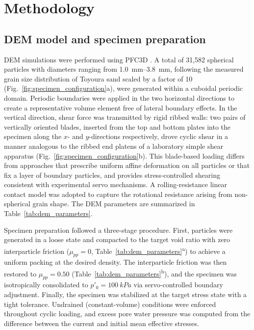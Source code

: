 \section{Methodology}
\label{sec:methodology}

\subsection{DEM model and specimen preparation}
\label{subsec:dem_model}

DEM simulations were performed using \textsc{PFC3D} \citep{Itasca2021}. A total of 31{,}582 spherical particles with diameters ranging from \SIrange{1.0}{3.8}{mm}, following the measured grain size distribution of Toyoura sand scaled by a factor of 10 (Fig.~\ref{fig:specimen_configuration}a), were generated within a cuboidal periodic domain. Periodic boundaries were applied in the two horizontal directions to create a representative volume element free of lateral boundary effects. In the vertical direction, shear force was transmitted by rigid ribbed walls: two pairs of vertically oriented blades, inserted from the top and bottom plates into the specimen along the $x$- and $y$-directions respectively, drove cyclic shear in a manner analogous to the ribbed end platens of a laboratory simple shear apparatus (Fig.~\ref{fig:specimen_configuration}b). This blade-based loading differs from approaches that prescribe uniform affine deformation on all particles \citep{Thornton2000} or that fix a layer of boundary particles, and provides stress-controlled shearing consistent with experimental servo mechanisms. A rolling-resistance linear contact model \citep{IwashitaOda1998,WensrichKatterfeld2012} was adopted to capture the rotational resistance arising from non-spherical grain shape. The DEM parameters are summarized in Table~\ref{tab:dem_parameters}.

Specimen preparation followed a three-stage procedure. First, particles were generated in a loose state and compacted to the target void ratio with zero interparticle friction ($\mu_{pp} = 0$, Table~\ref{tab:dem_parameters}\textsuperscript{a}) to achieve a uniform packing at the desired density. The interparticle friction was then restored to $\mu_{pp} = 0.50$ (Table~\ref{tab:dem_parameters}\textsuperscript{b}), and the specimen was isotropically consolidated to $p'_0 = \SI{100}{kPa}$ via servo-controlled boundary adjustment. Finally, the specimen was stabilized at the target stress state with a tight tolerance. Undrained (constant-volume) conditions were enforced throughout cyclic loading, and excess pore water pressure was computed from the difference between the current and initial mean effective stresses.

